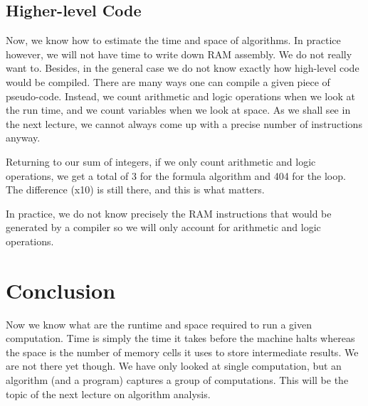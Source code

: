 \documentclass{aldast}
\begin{document}
\subsection{Higher-level Code}

Now, we know how to estimate the time and space of algorithms. In
practice however, we will not have time to write down RAM assembly. We
do not really want to. Besides, in the general case we do not know
exactly how high-level code would be compiled. There are many ways one
can compile a given piece of pseudo-code. Instead, we count arithmetic
and logic operations when we look at the run time, and we count
variables when we look at space. As we shall see in the next lecture,
we cannot always come up with a precise number of instructions anyway.

Returning to our sum of integers, if we only count arithmetic and
logic operations, we get a total of 3 for the formula algorithm and
404 for the loop. The difference (x10) is still there, and this is
what matters.

\begin{takeaway}
  In practice, we do not know precisely the RAM instructions that
  would be generated by a compiler so we will only account for
  arithmetic and logic operations.
\end{takeaway}


\section*{Conclusion}

Now we know what are the runtime and space required to run a given
computation. Time is simply the time it takes before the machine halts
whereas the space is the number of memory cells it uses to store
intermediate results. We are not there yet though. We have only looked
at single computation, but an algorithm (and a program) captures a
group of computations. This will be the topic of the next lecture on
algorithm analysis.



\end{document}
